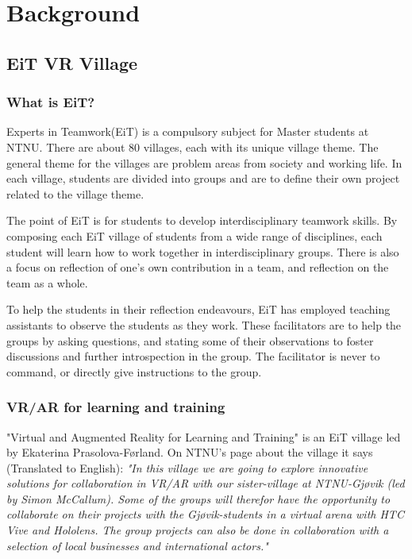 \chapter{Background}
    \label{chap:background}

    \section{EiT VR Village}
        \subsection{What is EiT?}
            Experts in Teamwork(EiT) is a compulsory subject for Master students at NTNU. There are about 80 villages, each with its unique village theme. The general theme for the villages are problem areas from society and working life. In each village, students are divided into groups and are to define their own project related to the village theme.\cite{EiTAbout}
            
            The point of EiT is for students to develop interdisciplinary teamwork skills. By composing each EiT village of students from a wide range of disciplines, each student will learn how to work together in interdisciplinary groups. There is also a focus on reflection of one's own contribution in a team, and reflection on the team as a whole.\cite{EiTAbout}
            
            To help the students in their reflection endeavours, EiT has employed teaching assistants to observe the students as they work. These facilitators are to help the groups by asking questions, and stating some of their observations to foster discussions and further introspection in the group. The facilitator is never to command, or directly give instructions to the group. 
        
        \subsection{VR/AR for learning and training}
            "Virtual and Augmented Reality for Learning and Training" is an EiT village led by Ekaterina Prasolova-Førland. On NTNU's page about the village it says (Translated to English): \emph{"In this village we are going to explore innovative solutions for collaboration in VR/AR with our sister-village at NTNU-Gjøvik (led by Simon McCallum). Some of the groups will therefor have the opportunity to collaborate on their projects with the Gjøvik-students in a virtual arena with HTC Vive and Hololens. The group projects can also be done in collaboration with a selection of local businesses and international actors."}
            
